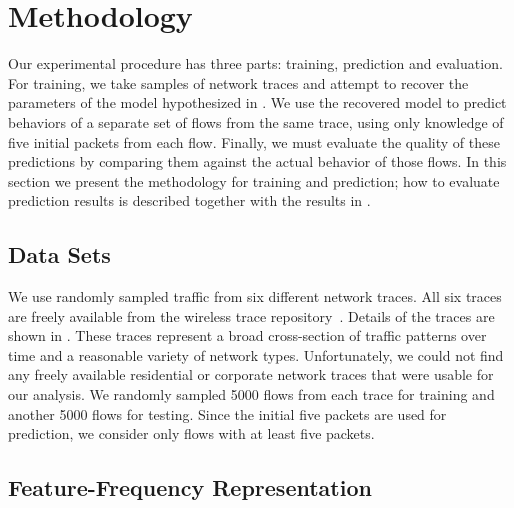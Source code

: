 \documentclass[conference]{IEEEtran}
\begin{document}
\section{Methodology}

Our experimental procedure has three parts:
training, prediction and evaluation.
For training, we take samples of network traces and attempt to recover the parameters of the model hypothesized in .
We use the recovered model to predict behaviors of a separate set of flows from the same trace, using only knowledge of five initial packets from each flow.
Finally, we must evaluate the quality of these predictions by comparing them against the actual behavior of those flows.
In this section we present the methodology for training and prediction;
how to evaluate prediction results is described together with the results in .

\subsection{Data Sets}

We use randomly sampled traffic from six different network traces.
All six traces are freely available from the  wireless trace repository~\cite{Yeo06}.
Details of the traces are shown in .
These traces represent a broad cross-section of traffic patterns over time and a reasonable variety of network types.
Unfortunately, we could not find any freely available residential or corporate network traces that were usable for our analysis.
We randomly sampled 5000 flows from each trace for training and another 5000 flows for testing.
Since the initial five packets are used for prediction, we consider only flows with at least five packets.

\subsection{Feature-Frequency Representation}
\end{document}
